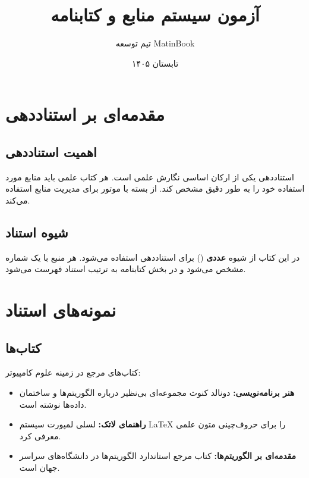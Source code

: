 \documentclass{matinbook}
\title{آزمون سیستم منابع و کتابنامه}
\author{تیم توسعه MatinBook}
\date{تابستان ۱۴۰۵}
\begin{document}
\maketitle

\chapter{مقدمه‌ای بر استناددهی}

\section{اهمیت استناددهی}

استناددهی یکی از ارکان اساسی
نگارش علمی است. هر کتاب علمی باید منابع مورد استفاده
خود را به طور دقیق مشخص کند. 
از بسته  با موتور 
برای مدیریت منابع استفاده می‌کند.

\section{شیوه استناد}

در این کتاب از شیوه \textbf{عددی} ()
برای استناددهی استفاده می‌شود. هر منبع با یک شماره
مشخص می‌شود و در بخش کتابنامه به ترتیب استناد
فهرست می‌شود.

\chapter{نمونه‌های استناد}

\section{کتاب‌ها}

کتاب‌های مرجع در زمینه علوم کامپیوتر:

\begin{itemize}
    \item \textbf{هنر برنامه‌نویسی:}
    دونالد کنوث \cite{knuth1984} مجموعه‌ای بی‌نظیر
    درباره الگوریتم‌ها و ساختمان داده‌ها نوشته است.
    
    \item \textbf{راهنمای لاتک:}
    لسلی لمپورت \cite{lamport1994} سیستم \LaTeX{}
    را برای حروف‌چینی متون علمی معرفی کرد.
    
    \item \textbf{مقدمه‌ای بر الگوریتم‌ها:}
    کتاب  \cite{cormen2009} مرجع استاندارد
    الگوریتم‌ها در دانشگاه‌های سراسر جهان است.
\end{itemize}
\end{document}
